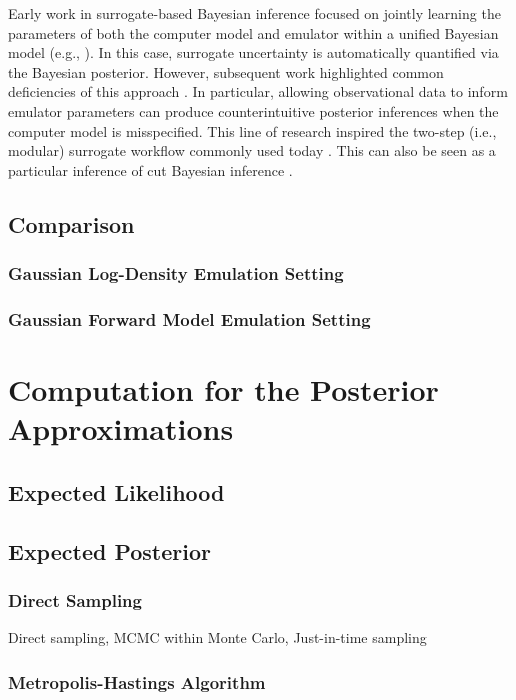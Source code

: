 \documentclass[12pt]{article}
\begin{document}
Early work in surrogate-based Bayesian inference focused on jointly learning
the parameters of both the computer model and emulator within a unified Bayesian model 
(e.g., \citet{KOH}). In this case, surrogate uncertainty is automatically quantified via the 
Bayesian posterior. However, subsequent work highlighted common deficiencies of this
approach \citep{modularization}. In particular, allowing observational data to inform 
emulator parameters can produce counterintuitive posterior inferences when the computer
model is misspecified. This line of research inspired the two-step (i.e., modular)
surrogate workflow commonly used today \citep{modularization,BurknerTwoStep,BurknerSurrogate}.
This can also be seen as a particular inference of cut Bayesian inference \citep{PlummerCut}. 


\subsection{Comparison}
\subsubsection{Gaussian Log-Density Emulation Setting}
\subsubsection{Gaussian Forward Model Emulation Setting}

\section{Computation for the Posterior Approximations} \label{sec:computation}
\subsection{Expected Likelihood}
\subsection{Expected Posterior}
\subsubsection{Direct Sampling}
Direct sampling, MCMC within Monte Carlo, Just-in-time sampling
\subsubsection{Metropolis-Hastings Algorithm}
\end{document}
